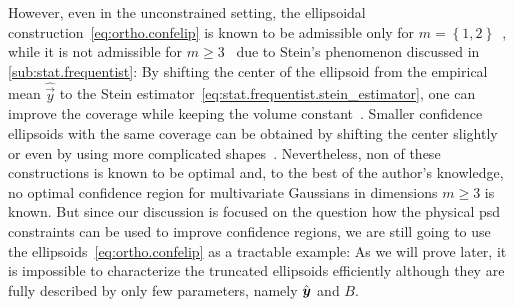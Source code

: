 However, even in the unconstrained setting, the ellipsoidal construction~\eqref{eq:ortho.confelip} is known to be admissible only for $m=\left\{ 1,2\right\}$~\cite{Joshi_1969_Admissibility}, while it is not admissible for $m\geq3$~\cite{Joshi_1967_Inadmissibility} due to Stein's phenomenon discussed in \cref{sub:stat.frequentist}:
By shifting the center of the ellipsoid from the empirical mean $\hat{\vec y}$ to the Stein estimator~\eqref{eq:stat.frequentist.stein_estimator}, one can improve the coverage while keeping the volume constant~\cite{Joshi_1967_Inadmissibility}.
Smaller confidence ellipsoids with the same coverage can be obtained by shifting the center slightly~\cite{Tseng_1997_Good,Hwang_1982_Minimax} or even by using more complicated shapes~\cite{Shinozaki_????_Improved,Brown_1995_Optimal}.
Nevertheless, non of these constructions is known to be optimal and, to the best of the author's knowledge, no optimal confidence region for multivariate Gaussians in dimensions $m \ge 3$ is known.
But since our discussion is focused on the question how the physical psd constraints can be used to improve confidence regions, we are still going to use the ellipsoids~\eqref{eq:ortho.confelip} as a tractable example:
As we will prove later, it is impossible to characterize the truncated ellipsoids efficiently although they are fully described by only few parameters, namely $\hat{{\boldsymbol{y}}}$ and $B$.\\



